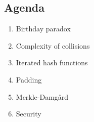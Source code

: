 

\subsection{Agenda}
\begin{enumerate}
\item Birthday paradox
\item Complexity of collisions
\item Iterated hash functions
\item Padding
\item Merkle-Damgård
\item Security
\end{enumerate}
